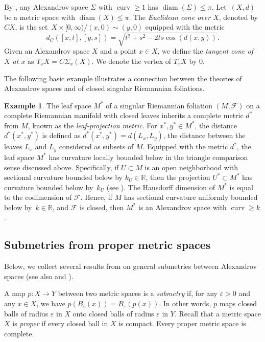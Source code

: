 \documentclass[10pt,a4paper]{amsart}
\numberwithin{equation}{section}
\theoremstyle{definition}
\newtheorem{Example}[thm]{Example}
\DeclareMathOperator{\curv}{curv}
\DeclareMathOperator{\diam}{diam}
\newcommand{\R}{\mathbb{R}} %
\newcommand{\fol}{\mathcal{F}}
\begin{document}
By \cite[Theorem~10.4.1]{BuragoBuragoIvanov}, any Alexandrov space $\Sigma$ with $\curv \geq 1$ has $\diam(\Sigma)\leq \pi$. Let~$(X,d)$ be a metric space with $\diam(X)\leq \pi$. The \emph{Euclidean cone over $X$}, denoted by $CX$, is the set~${X\times [0,\infty)/(x,0)\sim (y,0)}$ equipped with the metric
\[
	d_C([x,t],[y,s]) = \sqrt{t^2+s^2-2ts\cos(d(x,y))}.
\]
Given an Alexandrov space $X$ and a point $x\in X$, we define the \emph{tangent cone of $X$ at $x$} as $T_x X = C\Sigma_x(X)$. We denote the vertex of $T_xX$ by $0$.

The following basic example illustrates a connection between the theories of Alexandrov spaces and of closed singular Riemannian foliations.

\begin{Example}	
\label{ex:quotient.of.srf.is.alex.space}
The leaf space $M^\ast$ of a singular Riemannian foliation $(M,\fol)$ on a complete Riemannian manifold with closed leaves inherits a complete metric $d^\ast$ from $M$, known as the \emph{leaf-projection metric}.
For $x^\ast,y^\ast\in M^\ast$, the distance $d^\ast(x^\ast,y^\ast)$ is defined as
$
	 d^\ast(x^\ast,y^\ast) = d(L_x,L_y)$,
the distance between the leaves $L_x$ and $L_y$ considered as subsets of $M$.
Equipped with the metric $d^\ast$, the leaf space $M^\ast$ has curvature locally bounded below in the triangle comparison sense discussed above. Specifically, if $U\subset M$ is an open neighborhood with sectional curvature bounded below by $k_U\in \R$, then the projection $U^\ast \subset M^\ast$ has curvature bounded below by~$k_U$ (see \cite{LytchakThorbergsson2010}). The Hausdorff dimension of $M^*$ is equal to the codimension of $\fol$. Hence, if $M$ has sectional curvature uniformly bounded below by~$k\in \R$, and $\fol$ is closed, then $M^*$ is an Alexandrov space with $\curv \geq k$.
\end{Example}	


		
\subsection{Submetries from proper metric spaces}
\label{S: Submetries between proper metric spaces}	
Below, we collect several results from \cite{Lytchak} on general submetries between Alexandrov spaces (see also \cite{GuijarroWalschap2011} and \cite{KapovitchLytchak2022}).

A map $p\colon X \to Y$ between two metric spaces is a \emph{submetry} if, for any $\varepsilon>0$ and any $x\in X$, we have $p(B_\varepsilon(x)) =B_\varepsilon(p(x))$. In other words, $p$ maps closed balls of radius $\varepsilon$ in $X$ onto closed balls of radius $\varepsilon$ in $Y$. Recall that a metric space $X$ is \emph{proper} if every closed ball in $X$ is compact. Every proper metric space is complete.
\end{document}
